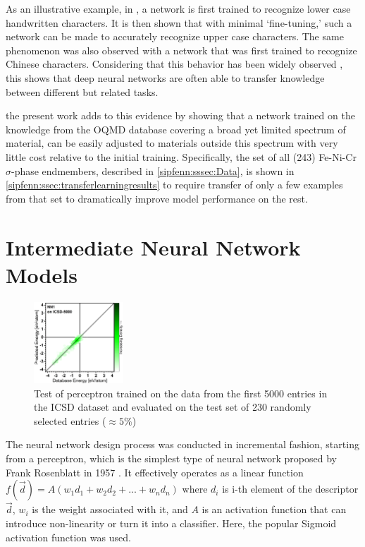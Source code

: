 As an illustrative example, in \cite{cirecsan2012transfer}, a network is first trained to recognize lower case handwritten characters. It is then shown that with minimal `fine-tuning,' such a network can be made to accurately recognize upper case characters. The same phenomenon was also observed with a network that was first trained to recognize Chinese characters. Considering that this behavior has been widely observed \cite{tan2018survey,chang2017unsupervised,george2018deep}, this shows that deep neural networks are often able to transfer knowledge between different but related tasks. 

the present work adds to this evidence by showing that a network trained on the knowledge from the OQMD database covering a broad yet limited spectrum of material, can be easily adjusted to materials outside this spectrum with very little cost relative to the initial training. Specifically, the set of all (243) Fe-Ni-Cr $\sigma$-phase endmembers, described in \ref{sipfenn:sssec:Data}, is shown in \ref{sipfenn:ssec:transferlearningresults} to require transfer of only a few examples from that set to dramatically improve model performance on the rest.

\pagebreak

\section{Intermediate Neural Network Models} \label{sipfenn:appendix2}


\begin{figure}[H]
    \centering
    \includegraphics[width=0.3\textwidth]{sipfenn/NN1_test.png}
    \caption{Test of perceptron trained on the data from the first 5000 entries in the ICSD dataset and evaluated on the test set of 230 randomly selected entries ($\approx5\%$)}
    \label{sipfenn:fig:nn1performance}
\end{figure}

The neural network design process was conducted in incremental fashion, starting from a perceptron, which is the simplest type of neural network proposed by Frank Rosenblatt in 1957 \cite{Rosenblatt1957TheAutomaton}. It effectively operates as a linear function $f(\vec{d}) = A(w_1 d_1 + w_2 d_2 + ... + w_n d_n)$ where $d_i$ is i-th element of the descriptor $\vec{d}$, $w_i$ is the weight associated with it, and $A$ is an activation function that can introduce non-linearity or turn it into a classifier. Here, the popular Sigmoid activation function was used. 

